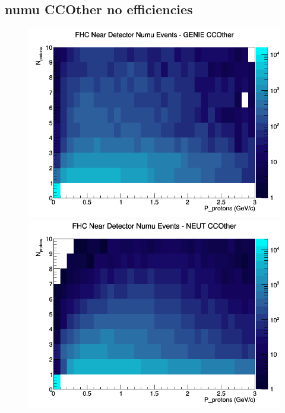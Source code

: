 \subsection{numu CCOther no efficiencies}
\begin{figure}[h]
\includegraphics[width=\linewidth]{N_P/nominal/protons/CCOther_FHC_ND_numu_N_P_GENIE.png}
\endminipage
{}
\includegraphics[width=\linewidth]{N_P/nominal/protons/CCOther_FHC_ND_numu_N_P_NEUT.png}
\endminipage
{}

\end{figure}
